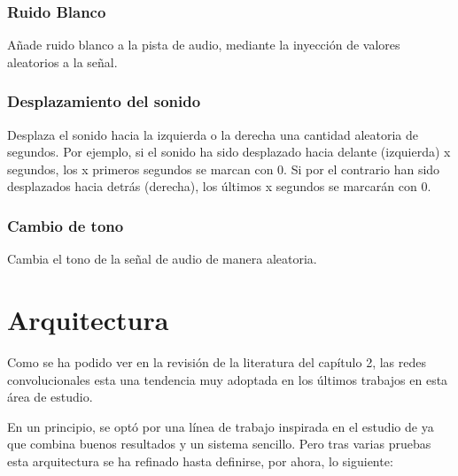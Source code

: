 \documentclass[11pt,a4paper,spanish]{book}
\begin{document}
	
		\subsubsection{Ruido Blanco}
		Añade ruido blanco a la pista de audio, mediante la inyección de valores aleatorios a la señal.
		
		\subsubsection{Desplazamiento del sonido}
		Desplaza el sonido hacia la izquierda o la derecha una cantidad aleatoria de segundos. Por ejemplo, si el sonido ha sido desplazado hacia delante (izquierda) x segundos, los x primeros segundos se marcan con 0. Si por el contrario han sido desplazados hacia detrás (derecha), los últimos x segundos se marcarán con 0.
		
		\subsubsection{Cambio de tono}
		Cambia el tono de la señal de audio de manera aleatoria.
		
	\section{Arquitectura}
	Como se ha podido ver en la revisión de la literatura del capítulo 2, las redes convolucionales esta una tendencia muy adoptada en los últimos trabajos en esta área de estudio.
	
	En un principio, se optó por una línea de trabajo inspirada en el estudio de \cite{AbdulQayyum2019} ya que combina buenos resultados y un sistema sencillo. Pero tras varias pruebas esta arquitectura se ha refinado hasta definirse, por ahora, lo siguiente:
	
\end{document}
